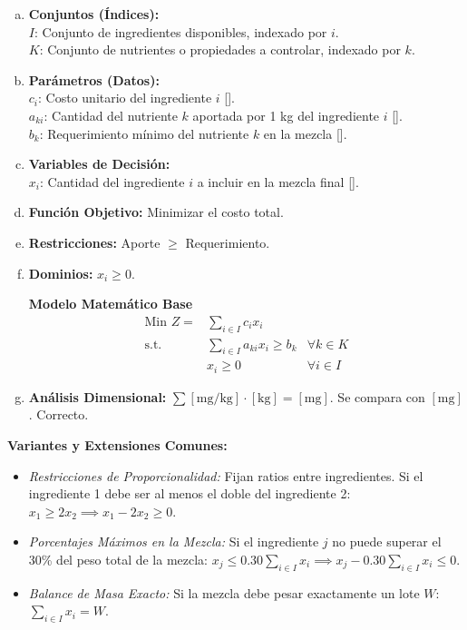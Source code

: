 \documentclass{article}
\begin{document}
	\begin{enumerate}[a)]
		\item \textbf{Conjuntos (Índices):}\\
		$I$: Conjunto de ingredientes disponibles, indexado por $i$.\\
		$K$: Conjunto de nutrientes o propiedades a controlar, indexado por $k$.
		
		\item \textbf{Parámetros (Datos):}\\
		$c_i$: Costo unitario del ingrediente $i$ [].\\
		$a_{ki}$: Cantidad del nutriente $k$ aportada por 1 kg del ingrediente $i$ [].\\
		$b_k$: Requerimiento mínimo del nutriente $k$ en la mezcla [].
		
		\item \textbf{Variables de Decisión:}\\
		$x_i$: Cantidad del ingrediente $i$ a incluir en la mezcla final [].
		\item \textbf{Función Objetivo:} Minimizar el costo total.
		\item \textbf{Restricciones:} Aporte $\geq$ Requerimiento.
		\item \textbf{Dominios:} $x_i \geq 0$.
		
		\begin{center}
			\textbf{Modelo Matemático Base}
			$$\begin{aligned}
				\text{Min } Z = & \sum_{i \in I} c_i x_i \\
				\text{s.t.} \quad & \sum_{i \in I} a_{ki} x_i \geq b_k & \forall k \in K \\
				& x_i \geq 0 & \forall i \in I
			\end{aligned}$$
		\end{center}
		
		\item \textbf{Análisis Dimensional:} $\sum [\text{mg/kg}] \cdot [\text{kg}] = [\text{mg}]$. Se compara con $[\text{mg}]$. Correcto.
	\end{enumerate}
	
	\textbf{Variantes y Extensiones Comunes:}
	\begin{itemize}
		\item \textit{Restricciones de Proporcionalidad:} Fijan ratios entre ingredientes. Si el ingrediente 1 debe ser al menos el doble del ingrediente 2: $x_1 \geq 2x_2 \implies x_1 - 2x_2 \geq 0$.
		\item \textit{Porcentajes Máximos en la Mezcla:} Si el ingrediente $j$ no puede superar el 30\% del peso total de la mezcla: $x_j \leq 0.30 \sum_{i \in I} x_i \implies x_j - 0.30 \sum_{i \in I} x_i \leq 0$.
		\item \textit{Balance de Masa Exacto:} Si la mezcla debe pesar exactamente un lote $W$: $\sum_{i \in I} x_i = W$.
	\end{itemize}
	
\end{document}
